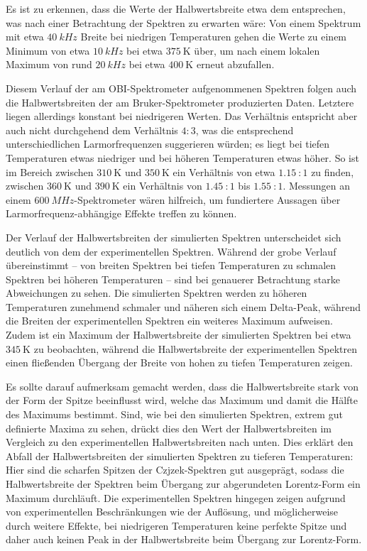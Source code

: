Es ist zu erkennen, dass die Werte der Halbwertsbreite etwa dem entsprechen, was nach einer Betrachtung der Spektren zu erwarten wäre: Von einem Spektrum mit etwa $\SI{40}{kHz}$ Breite bei niedrigen Temperaturen gehen die Werte zu einem Minimum von etwa $\SI{10}{kHz}$ bei etwa $\SI{375}{\kelvin}$ über, um nach einem lokalen Maximum von rund $\SI{20}{kHz}$ bei etwa $\SI{400}{\kelvin}$ erneut abzufallen.

Diesem Verlauf der am OBI-Spektrometer aufgenommenen Spektren folgen auch die Halbwertsbreiten der am Bruker-Spektrometer produzierten Daten. Letztere liegen allerdings konstant bei niedrigeren Werten. Das Verhältnis entspricht aber auch nicht durchgehend dem Verhältnis $4:3$, was die entsprechend unterschiedlichen Larmorfrequenzen suggerieren würden; es liegt bei tiefen Temperaturen etwas niedriger und bei höheren Temperaturen etwas höher. So ist im Bereich zwischen $\SI{310}{\kelvin}$ und $\SI{350}{\kelvin}$ ein Verhältnis von etwa $\SI{1.15}{}:1$ zu finden, zwischen $\SI{360}{\kelvin}$ und $\SI{390}{\kelvin}$ ein Verhältnis von $\SI{1.45}{}:1$ bis $\SI{1.55}{}:1$. Messungen an einem $\SI{600}{MHz}$-Spektrometer wären hilfreich, um fundiertere Aussagen über Larmorfrequenz-abhängige Effekte treffen zu können.

Der Verlauf der Halbwertsbreiten der simulierten Spektren unterscheidet sich deutlich von dem der experimentellen Spektren. Während der grobe Verlauf übereinstimmt -- von breiten Spektren bei tiefen Temperaturen zu schmalen Spektren bei höheren Temperaturen -- sind bei genauerer Betrachtung starke Abweichungen zu sehen. Die simulierten Spektren werden zu höheren Temperaturen zunehmend schmaler und näheren sich einem Delta-Peak, während die Breiten der experimentellen Spektren ein weiteres Maximum aufweisen. Zudem ist ein Maximum der Halbwertsbreite der simulierten Spektren bei etwa $\SI{345}{\kelvin}$ zu beobachten, während die Halbwertsbreite der experimentellen Spektren einen fließenden Übergang der Breite von hohen zu tiefen Temperaturen zeigen.

Es sollte darauf aufmerksam gemacht werden, dass die Halbwertsbreite stark von der Form der Spitze beeinflusst wird, welche das Maximum und damit die Hälfte des Maximums bestimmt. Sind, wie bei den simulierten Spektren, extrem gut definierte Maxima zu sehen, drückt dies den Wert der Halbwertsbreiten im Vergleich zu den experimentellen Halbwertsbreiten nach unten. Dies erklärt den Abfall der Halbwertsbreiten der simulierten Spektren zu tieferen Temperaturen: Hier sind die scharfen Spitzen der Czjzek-Spektren gut ausgeprägt, sodass die Halbwertsbreite der Spektren beim Übergang zur abgerundeten Lorentz-Form ein Maximum durchläuft. Die experimentellen Spektren hingegen zeigen aufgrund von experimentellen Beschränkungen wie der Auflösung, und möglicherweise durch weitere Effekte, bei niedrigeren Temperaturen keine perfekte Spitze und daher auch keinen Peak in der Halbwertsbreite beim Übergang zur Lorentz-Form.

